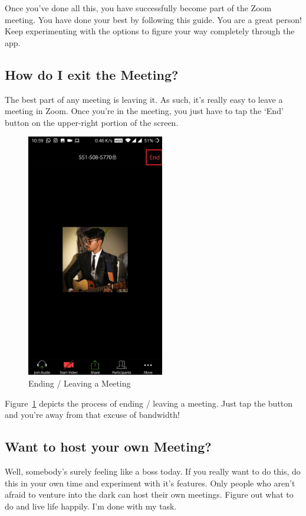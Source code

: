 \documentclass[14pt]{report}
\begin{document}
                            Once you've done all this, you have successfully become part of the Zoom meeting. You have done your best by following this guide. You are a great person! Keep experimenting with the options to figure your way completely through the app.\\

                        \subsection{How do I exit the Meeting?}
                            The best part of any meeting is leaving it. As such, it's really easy to leave a meeting in Zoom. Once you're in the meeting, you just have to tap the `End' button on the upper-right portion of the screen.\\
                            \begin{figure}[h]
                                \includegraphics[width=6cm]{EndMeet.jpeg}
                                \centering
                                \caption{Ending / Leaving a Meeting}
                                \label{fig:EndMeet}
                            \end{figure}

                            Figure~\ref{fig:EndMeet} depicts the process of ending / leaving a meeting. Just tap the button and you're away from that excuse of bandwidth!

                        \subsection{Want to host your own Meeting?}
                            Well, somebody's surely feeling like a boss today. If you really want to do this, do this in your own time and experiment with it's features. Only people who aren't afraid to venture into the dark can host their own meetings. Figure out what to do and live life happily. I'm done with my task.\\
\end{document}

